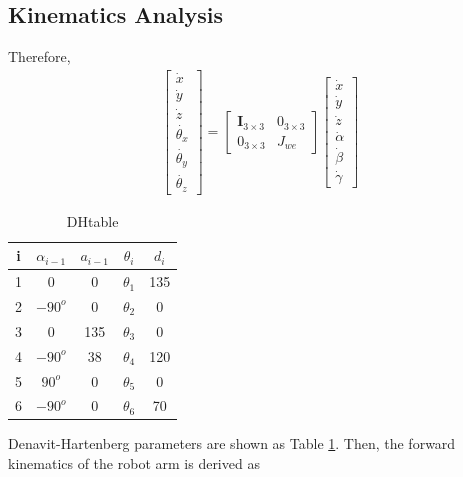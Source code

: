 \documentclass[12pt]{article}
\begin{document}
\begin{CJK}{UTF8}{bsmi}

\section{Kinematics Analysis}
Therefore,
\begin{equation}
\begin{split}
\begin{bmatrix}
\dot{x} \\
\dot{y} \\
\dot{z} \\
\dot{\theta _x} \\
\dot{\theta _y} \\
\dot{\theta _z} 
\end{bmatrix}
=
\begin{bmatrix}
\mathbf{I}_{3\times 3} & 0_{3\times 3}\\
0_{3\times 3} & J_{we}
\end{bmatrix}
\begin{bmatrix}
\dot{x} \\
\dot{y} \\
\dot{z} \\
\dot{\alpha} \\ 
\dot{\beta} \\ 
\dot{\gamma} 
\end{bmatrix}
\end{split}
\end{equation}
\begin{table}[h]
\centering
\caption{DHtable}
\label{tab:DHtable}
\begin{tabular}{ccccc} 
\hline \hline
	i	&$\alpha _{i-1}$	&$a_{i-1}$	&$\theta _i$			&$d_i$	\\\hline
	1   &0    				&0			&$\theta _1$			&135 \\
	2   &$-90^{o}$   		&0			&$\theta _2$			&0 \\
	3   &0    				&135		&$\theta _3$ 			&0 \\
	4   &$-90^{o}$    		&38			&$\theta _4$ 			&120 \\
	5   &$90^{o}$    		&0			&$\theta _5$ 			&0 \\
	6   &$-90^{o}$    		&0			&$\theta _6$ 			&70 \\
\end{tabular}
\end{table}
Denavit-Hartenberg parameters are shown as Table \ref{tab:DHtable}. Then, the forward kinematics of the robot arm is derived as
\begin{equation*}

\end{equation*}
\end{CJK}
\end{document}
